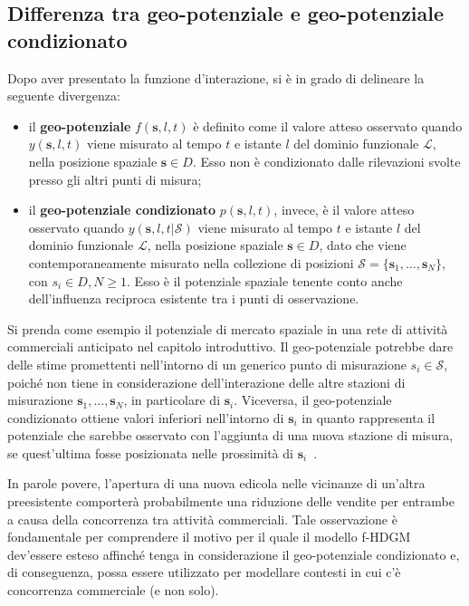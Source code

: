 \subsection[Differenza tra geo-potenziale e geo-potenziale condizionato]{Differenza tra geo-potenziale e geo-potenziale condizionato}
Dopo aver presentato la funzione d'interazione, si è in grado di delineare la seguente divergenza:
\begin{itemize}
	\item il \textbf{geo-potenziale}  $f(\mathbf{s}, l, t)$ è definito come il valore atteso osservato quando $y(\mathbf{s}, l, t)$ viene misurato al tempo $t$ e istante $l$ del dominio funzionale $\mathcal{L}$, nella posizione spaziale $\mathbf{s} \in D$. Esso non è condizionato dalle rilevazioni svolte presso gli altri punti di misura;
	\item il \textbf{geo-potenziale condizionato} $p(\mathbf{s}, l, t)$, invece, è il valore atteso osservato quando $y(\mathbf{s}, l, t| \mathcal{S})$
	viene misurato al tempo $t$ e istante $l$ del dominio funzionale $\mathcal{L}$, nella posizione spaziale $\mathbf{s} \in D$, dato che viene contemporaneamente misurato nella collezione di posizioni $\mathcal{S} = \{\mathbf{s}_1, \ldots, \mathbf{s}_N\}$,  con $s_i \in D, N \geq 1$. Esso è il potenziale spaziale tenente conto anche dell'influenza reciproca esistente tra i punti di osservazione.
\end{itemize}
Si prenda come esempio il potenziale di mercato spaziale in  una rete di attività commerciali anticipato nel capitolo introduttivo. Il geo-potenziale potrebbe dare delle stime promettenti nell'intorno di un generico punto di misurazione $s_i \in\mathcal{S}$, poiché non tiene in considerazione dell'interazione delle altre stazioni di misurazione $\mathbf{s}_1, \ldots, \mathbf{s}_N$, in particolare di $\mathbf{s}_i$. Viceversa, il geo-potenziale condizionato ottiene valori inferiori nell'intorno di $\mathbf{s}_i$ in quanto rappresenta il potenziale che sarebbe osservato con l'aggiunta di una  nuova stazione di misura, se quest'ultima fosse posizionata nelle prossimità di $\mathbf{s}_i$~\citep{paper_GPM}.\par In parole povere, l'apertura di una nuova edicola nelle vicinanze di un'altra preesistente comporterà probabilmente una riduzione delle vendite per entrambe a causa della concorrenza tra attività commerciali. Tale osservazione è fondamentale per comprendere il motivo per il quale il modello f-HDGM dev'essere esteso affinché tenga in considerazione il geo-potenziale condizionato e, di conseguenza, possa essere utilizzato per modellare contesti in cui c'è concorrenza commerciale (e non solo).

